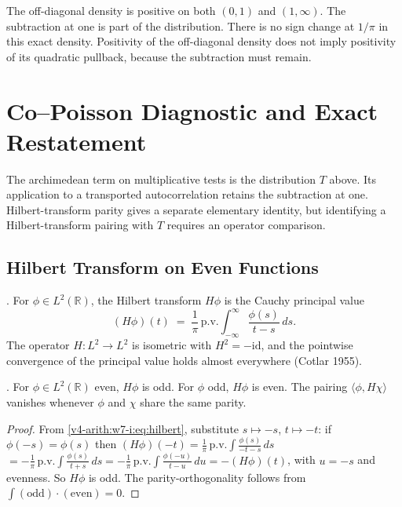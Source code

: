 \begin{remark}
\label{v4-arith:w7-i:rem:sign-tilde-g}
The off-diagonal density is positive on both $(0,1)$ and
$(1,\infty)$. The subtraction at one is part of the distribution.
There is no sign change at $1/\pi$ in this exact density.
Positivity of the off-diagonal density does not imply positivity
of its quadratic pullback, because the subtraction must remain.
\end{remark}
\section{Co--Poisson Diagnostic and Exact Restatement}
\label{v4-arith:w7-i:copoisson-subclass}


The archimedean term on multiplicative tests is the distribution
$T$ above. Its application to a transported autocorrelation
retains the subtraction at one. Hilbert-transform parity gives a
separate elementary identity, but identifying a Hilbert-transform
pairing with $T$ requires an operator comparison.
\subsection{Hilbert Transform on Even Functions}
\label{v4-arith:w7-i:copoisson:hilbert}

\begin{definition}
\label{v4-arith:w7-i:def:hilbert}
\ClaimStatusDefinitional. For \(\phi\in L^{2}(\mathbb{R})\), the Hilbert
transform \(H\phi\) is the Cauchy principal value
\begin{equation}
\label{v4-arith:w7-i:eq:hilbert}
(H\phi)(t)\;=\;\frac{1}{\pi}\,\mathrm{p.v.}\!\int_{-\infty}^{\infty}\frac{\phi(s)}{t-s}\,ds.
\end{equation}
The operator \(H\colon L^{2}\to L^{2}\) is isometric with
\(H^{2}=-\mathrm{id}\), and the pointwise convergence of the principal
value holds almost everywhere (Cotlar 1955).
\end{definition}

\begin{lemma}
\label{v4-arith:w7-i:lem:hilbert-even}
\ClaimStatusProvedHere. For \(\phi\in L^{2}(\mathbb{R})\) even, \(H\phi\)
is odd. For \(\phi\) odd, \(H\phi\) is even. The pairing
\(\langle\phi, H\chi\rangle\) vanishes whenever \(\phi\) and \(\chi\)
share the same parity.
\end{lemma}

\begin{proof}
From \eqref{v4-arith:w7-i:eq:hilbert}, substitute \(s\mapsto-s\),
\(t\mapsto-t\): if \(\phi(-s)=\phi(s)\) then
\((H\phi)(-t)=\frac{1}{\pi}\,\mathrm{p.v.}\int\frac{\phi(s)}{-t-s}\,ds\)
\(=-\frac{1}{\pi}\,\mathrm{p.v.}\int\frac{\phi(s)}{t+s}\,ds
=-\frac{1}{\pi}\,\mathrm{p.v.}\int\frac{\phi(-u)}{t-u}\,du=-(H\phi)(t)\),
with \(u=-s\) and evenness. So \(H\phi\) is odd. The parity-orthogonality
follows from \(\int(\text{odd})\cdot(\text{even})=0\).
\end{proof}


